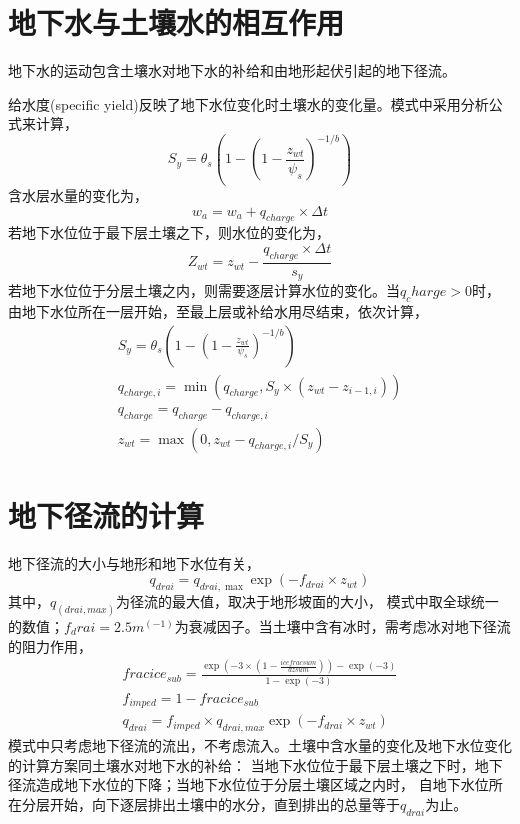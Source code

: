 \section{地下水与土壤水的相互作用}
地下水的运动包含土壤水对地下水的补给和由地形起伏引起的地下径流。


给水度(specific yield)反映了地下水位变化时土壤水的变化量。模式中采用分析公式来计算，
\begin{equation}
{S}_{{y}}=\theta_{s}\left(1-\left(1-\frac{z_{w t}}{\psi_{s}}\right)^{-1 / b}\right)
\end{equation}
含水层水量的变化为，
\begin{equation}
w_{a}=w_{a}+q_{charge} \times \Delta t
\end{equation}
若地下水位位于最下层土壤之下，则水位的变化为，
\begin{equation}
Z_{w t}=z_{w t}-\frac{q_{charge} \times \Delta t}{s_{y}}
\end{equation}
若地下水位位于分层土壤之内，则需要逐层计算水位的变化。当$q_charge>0$时，
由地下水位所在一层开始，至最上层或补给水用尽结束，依次计算，
\begin{equation}
\begin{array}{c}{S}_{{y}}=\theta_{s}\left(1-\left(1-\frac{z_{w t}}{\psi_{s}}\right)^{-1 / b}\right) \\
     q_{ {charge }, i}=\min \left(q_{ {charge }}, S_{y} \times \left(z_{w t}-z_{i-1, i}\right)\right) \\
      q_{ {charge }}=q_{ {charge }}-q_{ {charge }, i} \\ 
      z_{w t}=\max \left(0, z_{w t}-q_{ {charge }, i} / S_{y}\right)\end{array}
\end{equation}


\section{地下径流的计算}
地下径流的大小与地形和地下水位有关，
\begin{equation}
{q}_{{drai}}=q_{d r a i, \max } \exp \left(-f_{d r a i} \times z_{w t}\right)
\end{equation}
其中，$q_(drai,max)$为径流的最大值，取决于地形坡面的大小，
模式中取全球统一的数值；$f_drai=2.5m^(-1)$为衰减因子。当土壤中含有冰时，需考虑冰对地下径流的阻力作用，
\begin{equation}
\begin{array}{c} { fracice }_{ {sub }}=\frac{\exp \left(-3 \times\left(1-\frac{i c e f r a c s u m}{d z s u m}\right)\right)
    -\exp (-3)}{1-\exp (-3)} \\ f_{ {imped }}=1- { fracice }_{s u b} \\ {q}_{{drai}}=f_{ {imped }} \times q_{ {drai,max }} 
    \exp \left(-f_{d r a i} \times z_{w t}\right)\end{array}
\end{equation}
模式中只考虑地下径流的流出，不考虑流入。土壤中含水量的变化及地下水位变化的计算方案同土壤水对地下水的补给：
当地下水位位于最下层土壤之下时，地下径流造成地下水位的下降；当地下水位位于分层土壤区域之内时，
自地下水位所在分层开始，向下逐层排出土壤中的水分，直到排出的总量等于$q_{drai}$为止。


